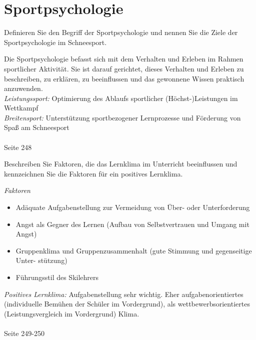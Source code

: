 \section{Sportpsychologie}

\begin{question}{3}
Definieren Sie den Begriff der Sportpsychologie und nennen Sie die Ziele der Sportpsychologie im Schneesport.
\end{question}
\begin{solution}
Die Sportpsychologie befasst sich mit dem Verhalten und Erleben im Rahmen sportlicher Aktivität. Sie ist darauf gerichtet, dieses Verhalten und Erleben zu beschreiben, zu erklären, zu beeinflussen und das gewonnene Wissen praktisch anzuwenden.\\
\emph{Leistungssport:} Optimierung des Ablaufs sportlicher (Höchst-)Leistungen im Wettkampf\\
\emph{Breitensport:} Unterstützung sportbezogener Lernprozesse und Förderung von Spaß am Schneesport\\\\
 Seite 248
\end{solution}

\begin{question}{4}
Beschreiben Sie Faktoren, die das Lernklima im Unterricht beeinflussen und kennzeichnen Sie die Faktoren für ein positives Lernklima.
\end{question}
\begin{solution}
\emph{Faktoren}
\begin{itemize}
\item Adäquate Aufgabenstellung zur Vermeidung von Über- oder Unterforderung
\item Angst als Gegner des Lernen (Aufbau von Selbstvertrauen und Umgang mit Angst)
\item Gruppenklima und Gruppenzusammenhalt (gute Stimmung und gegenseitige Unter-
stützung)
\item Führungsstil des Skilehrers
\end{itemize}
\emph{Positives Lernklima:} Aufgabenstellung sehr wichtig. Eher aufgabenorientiertes (individuelle Bemühen der Schüler im Vordergrund), als wettbewerbsorientiertes (Leistungsvergleich im Vordergrund) Klima.\\\\
 Seite 249-250
\end{solution}


